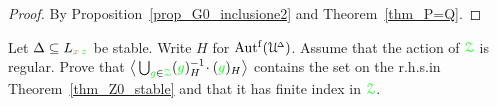 \begin{proof}  
  By Proposition~\ref{prop_G0_inclusione2} and Theorem~\ref{thm_P=Q}.
\end{proof}

\begin{exercise}
  Let $\Delta\subseteq L_{{\color{brown} x}\,{\color{green} z}}$ be stable.
  Write $H$ for $\mbox{Aut$^{\rm f}$}(\EuScript U\kern-.2ex^{\scriptscriptstyle\Delta})$.
  Assume that the action of ${\color{green}\EuScript Z}$ is regular.
  Prove that $\big\langle\bigcup_{{\color{green} g}\in{\color{green}\EuScript Z}}({\color{green} g})_H^{-1}\!\cdot({\color{green} g})_H\big\rangle$ contains the set on the r.h.s.\@ in Theorem~\ref{thm_Z0_stable} and that it has finite index in ${\color{green}\EuScript Z}$.
\end{exercise}

  
  



  




